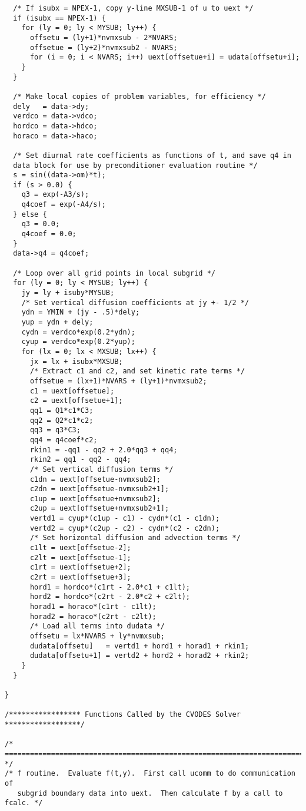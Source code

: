 \begin{verbatim}
  /* If isubx = NPEX-1, copy y-line MXSUB-1 of u to uext */
  if (isubx == NPEX-1) {
    for (ly = 0; ly < MYSUB; ly++) {
      offsetu = (ly+1)*nvmxsub - 2*NVARS;
      offsetue = (ly+2)*nvmxsub2 - NVARS;
      for (i = 0; i < NVARS; i++) uext[offsetue+i] = udata[offsetu+i];
    }
  }

  /* Make local copies of problem variables, for efficiency */
  dely   = data->dy;
  verdco = data->vdco;
  hordco = data->hdco;
  horaco = data->haco;

  /* Set diurnal rate coefficients as functions of t, and save q4 in 
  data block for use by preconditioner evaluation routine */
  s = sin((data->om)*t);
  if (s > 0.0) {
    q3 = exp(-A3/s);
    q4coef = exp(-A4/s);
  } else {
    q3 = 0.0;
    q4coef = 0.0;
  }
  data->q4 = q4coef;

  /* Loop over all grid points in local subgrid */
  for (ly = 0; ly < MYSUB; ly++) {
    jy = ly + isuby*MYSUB;
    /* Set vertical diffusion coefficients at jy +- 1/2 */
    ydn = YMIN + (jy - .5)*dely;
    yup = ydn + dely;
    cydn = verdco*exp(0.2*ydn);
    cyup = verdco*exp(0.2*yup);
    for (lx = 0; lx < MXSUB; lx++) {
      jx = lx + isubx*MXSUB;
      /* Extract c1 and c2, and set kinetic rate terms */
      offsetue = (lx+1)*NVARS + (ly+1)*nvmxsub2;
      c1 = uext[offsetue];
      c2 = uext[offsetue+1];
      qq1 = Q1*c1*C3;
      qq2 = Q2*c1*c2;
      qq3 = q3*C3;
      qq4 = q4coef*c2;
      rkin1 = -qq1 - qq2 + 2.0*qq3 + qq4;
      rkin2 = qq1 - qq2 - qq4;
      /* Set vertical diffusion terms */
      c1dn = uext[offsetue-nvmxsub2];
      c2dn = uext[offsetue-nvmxsub2+1];
      c1up = uext[offsetue+nvmxsub2];
      c2up = uext[offsetue+nvmxsub2+1];
      vertd1 = cyup*(c1up - c1) - cydn*(c1 - c1dn);
      vertd2 = cyup*(c2up - c2) - cydn*(c2 - c2dn);
      /* Set horizontal diffusion and advection terms */
      c1lt = uext[offsetue-2];
      c2lt = uext[offsetue-1];
      c1rt = uext[offsetue+2];
      c2rt = uext[offsetue+3];
      hord1 = hordco*(c1rt - 2.0*c1 + c1lt);
      hord2 = hordco*(c2rt - 2.0*c2 + c2lt);
      horad1 = horaco*(c1rt - c1lt);
      horad2 = horaco*(c2rt - c2lt);
      /* Load all terms into dudata */
      offsetu = lx*NVARS + ly*nvmxsub;
      dudata[offsetu]   = vertd1 + hord1 + horad1 + rkin1; 
      dudata[offsetu+1] = vertd2 + hord2 + horad2 + rkin2;
    }
  }

}

/***************** Functions Called by the CVODES Solver ******************/

/* ======================================================================= */
/* f routine.  Evaluate f(t,y).  First call ucomm to do communication of 
   subgrid boundary data into uext.  Then calculate f by a call to fcalc. */


\end{verbatim}
